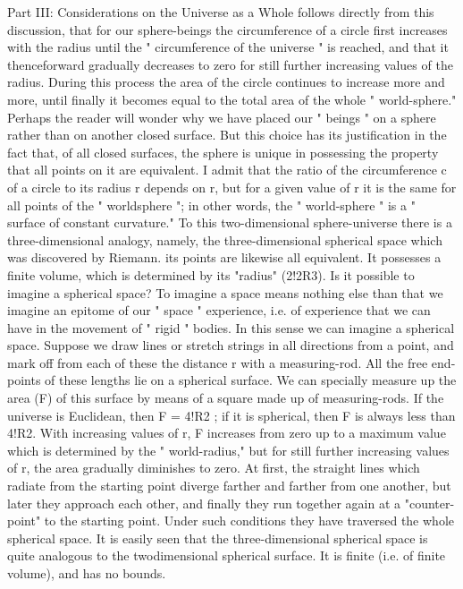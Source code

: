 \documentclass{article}
\begin{document}
Part III: Considerations on the Universe as a Whole
follows directly from this discussion, that for our sphere-beings the circumference of a
circle first increases with the radius until the " circumference of the universe " is reached,
and that it thenceforward gradually decreases to zero for still further increasing values of
the radius. During this process the area of the circle continues to increase more and more,
until finally it becomes equal to the total area of the whole " world-sphere."
Perhaps the reader will wonder why we have placed our " beings " on a sphere rather than
on another closed surface. But this choice has its justification in the fact that, of all closed
surfaces, the sphere is unique in possessing the property that all points on it are equivalent. I
admit that the ratio of the circumference c of a circle to its radius r depends on r, but for a
given value of r it is the same for all points of the " worldsphere "; in other words, the "
world-sphere " is a " surface of constant curvature."
To this two-dimensional sphere-universe there is a three-dimensional analogy, namely,
the three-dimensional spherical space which was discovered by Riemann. its points are
likewise all equivalent. It possesses a finite volume, which is determined by its "radius"
(2!2R3). Is it possible to imagine a spherical space? To imagine a space means nothing else
than that we imagine an epitome of our " space " experience, i.e. of experience that we can
have in the movement of " rigid " bodies. In this sense we can imagine a spherical space.
Suppose we draw lines or stretch strings in all directions from a point, and mark off from
each of these the distance r with a measuring-rod. All the free end-points of these lengths lie
on a spherical surface. We can specially measure up the area (F) of this surface by means of
a square made up of measuring-rods. If the universe is Euclidean, then F = 4!R2 ; if it is
spherical, then F is always less than 4!R2. With increasing values of r, F increases from
zero up to a maximum value which is determined by the " world-radius," but for still further
increasing values of r, the area gradually diminishes to zero. At first, the straight lines
which radiate from the starting point diverge farther and farther from one another, but later
they approach each other, and finally they run together again at a "counter-point" to the
starting point. Under such conditions they have traversed the whole spherical space. It is
easily seen that the three-dimensional spherical space is quite analogous to the twodimensional spherical surface. It is finite (i.e. of finite volume), and has no bounds.
\end{document}
